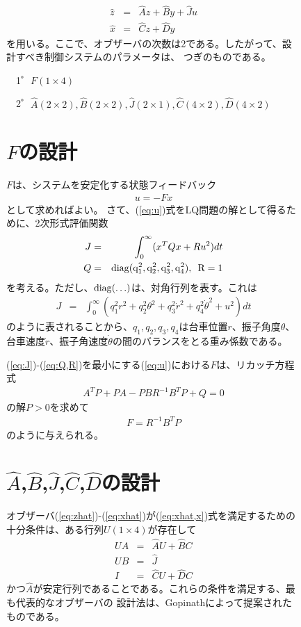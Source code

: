 \documentclass[a4j,11pt,twoside]{ujbook}
\begin{document}
\begin{figure}[htbp]
\begin{center}
\begin{eqnarray}
			\hat{z} & = & \hat{A}z + \hat{B}y + \hat{J}u
			\label{eq:zhat}\\
			\hat{x} & = & \hat{C}z + \hat{D}y
			\label{eq:xhat}
		\end{eqnarray}
		を用いる。ここで、オブザーバの次数は2である。したがって、設計すべき制御システムのパラメータは、
		つぎのものである。
		\begin{description}
			\item 　1゜$F(1\times4)$
			\item 　2゜$\hat{A}(2\times2),\hat{B}(2\times2),\hat{J}(2\times1),
					\hat{C}(4\times2),\hat{D}(4\times2)$
		\end{description}
		
	\section{$F$の設計}
		$F$は、システムを安定化する状態フィードバック
		\begin{eqnarray}
			u = -Fx
			\label{eq:u}
		\end{eqnarray}
		として求めればよい。
		さて、(\ref{eq:u})式をLQ問題の解として得るために、2次形式評価関数
		\begin{eqnarray}
			J &=& \int_0^\infty (x^TQx + Ru^2) dt
			\label{eq:J}\\
			Q &=& \rm{diag}(q^2_1,q^2_2,q^2_3,q^2_4), \,\,\, R = 1
			\label{eq:Q,R}
		\end{eqnarray}
		を考える。ただし、$\rm{diag}(\ldots)$は、対角行列を表す。これは
		\begin{eqnarray}
			J &=& \int_0^\infty (q^2_1r^2 + q^2_2\theta^2 + q^2_3\dot{r}^2 + q^2_4
			\dot{\theta}^2 + u^2) dt
		\end{eqnarray}
		のように表されることから、$q_1,q_2,q_3,q_4$は台車位置$r$、振子角度$\theta$、台車速度$\dot{r}$、振子角速度$\dot{\theta}$の間のバランスをとる重み係数である。
		
		(\ref{eq:J})-(\ref{eq:Q,R})を最小にする(\ref{eq:u})における$F$は、リカッチ方程式
		\begin{eqnarray*}
			A^TP + PA - PBR^{-1}B^TP + Q = 0
		\end{eqnarray*}
		の解$P > 0$を求めて
		\begin{eqnarray*}
			F = R^{-1}B^TP
		\end{eqnarray*}
		のように与えられる。
	
	\section{$\hat{A}$,$\hat{B}$,$\hat{J}$,$\hat{C}$,$\hat{D}$の設計}
		オブザーバ(\ref{eq:zhat})-(\ref{eq:xhat})が(\ref{eq:xhat,x})式を満足するための十分条件は、ある行列$U(1\times4)$が存在して
		\begin{eqnarray*}
			UA & = & \hat{A}U + \hat{B}C\\
			UB & = & \hat{J}\\
			I  & = & \hat{C}U + \hat{D}C
		\end{eqnarray*}
		かつ$\hat{A}$が安定行列であることである。これらの条件を満足する、最も代表的なオブザーバの
		設計法は、Gopinathによって提案されたものである。
		

\end{center}
\end{figure}
\end{document}
